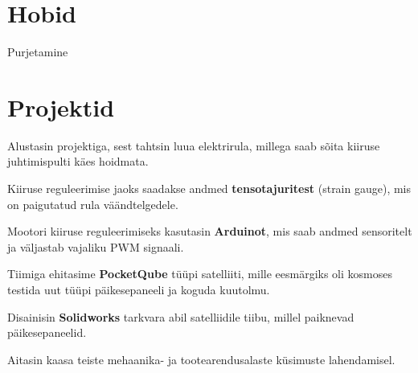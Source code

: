 \documentclass[letterpaper]{deedy-resume} %
\begin{document}

\newpage %

\begin{minipage}[t]{0.33\textwidth} %

\section{Hobid}

Purjetamine


\end{minipage} %
\hfill
\begin{minipage}[t]{0.66\textwidth} %


\section{Projektid}


\vspace{\topsep} %
\begin{tightitemize}
\item Alustasin projektiga, sest tahtsin luua elektrirula, millega saab sõita kiiruse juhtimispulti käes hoidmata.
\item Kiiruse reguleerimise jaoks saadakse andmed \textbf{tensotajuritest} (strain gauge), mis on paigutatud rula väändtelgedele.
\item Mootori kiiruse reguleerimiseks kasutasin \textbf{Arduinot}, mis saab andmed sensoritelt ja väljastab vajaliku PWM signaali.
\end{tightitemize}

\sectionspace %



\begin{tightitemize}
\item Tiimiga ehitasime \textbf{PocketQube} tüüpi satelliiti, mille eesmärgiks oli kosmoses testida uut tüüpi päikesepaneeli ja koguda kuutolmu.
\item Disainisin \textbf{Solidworks} tarkvara abil satelliidile tiibu, millel paiknevad päikesepaneelid.
\item Aitasin kaasa teiste mehaanika- ja tootearendusalaste küsimuste lahendamisel.
\end{tightitemize}


\end{minipage}
\end{document}
